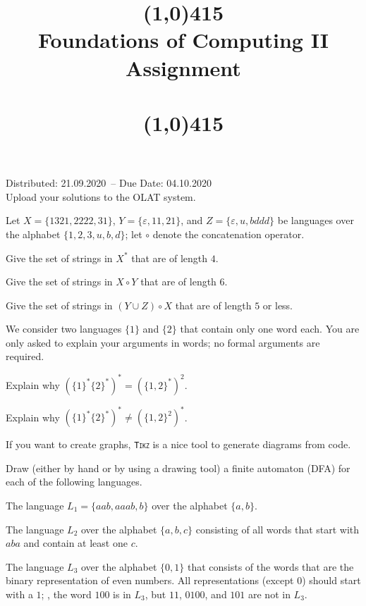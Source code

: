 \documentclass{exercise}
\title{\line(1,0){415}\\
  Foundations of Computing II\\
  \Large Assignment \theexercise\\[1em]
  \large{\topics}\\
  \line(1,0){415}}
\newcommand{\distdate}{21.09.2020}
\newcommand{\duedate}{04.10.2020}
\begin{document}
\maketitle

\begin{center}
  Distributed: \distdate\ -- Due Date: \duedate\\[1em]
  Upload your solutions to the OLAT system.\\[3em]
\end{center}


\subtask Let $X = \{1321,2222,31\}$, $Y =\{\varepsilon,11,21\}$, and
  $Z = \{\varepsilon,u,bddd\}$ be languages over the alphabet $\{1,2,3,u,b,d\}$;
  let $\circ$ denote the concatenation operator.
  \begin{taskitems}
    \item Give the set of strings in $X^*$ that are of length $4$.
    \item Give the set of strings in $X \circ Y$ that are of length $6$.
    \item Give the set of strings in $(Y \cup Z) \circ X$ that are of length $5$ or less.
  \end{taskitems}


\subtask We consider two languages $\{1\}$ and $\{2\}$ that contain only one word each.
  You are only asked to explain your arguments in words; no formal arguments are
  required. 
  \begin{taskitems}
    \item Explain why $(\{1\}^*\{2\}^*)^* =   (\{1,2\}^*)^2$.
    \item Explain why $(\{1\}^*\{2\}^*)^* \ne (\{1,2\}^2)^*$.
  \end{taskitems}



If you want to create graphs, \texttt{\textsc{Tikz}} is a nice tool to generate diagrams
from code.

\subtask Draw (either by hand or by using a drawing tool) a finite
  automaton (DFA) for each of the following languages.
  \begin{taskitems}
    \item The language $L_1=\{aab,aaab,b\}$ over the alphabet $\{a,b\}$.
    \item The language $L_2$ over the alphabet $\{a,b,c\}$ consisting of all words that start with
      $aba$ and contain at least one $c$.
    \item The language $L_3$ over the alphabet $\{0,1\}$ that consists of the words that are the binary
      representation of even numbers.  All representations (except $0$) should start with a $1$; \eg,
			the word $100$ is in $L_3$, but $11$, $0100$, and $101$ are not in $L_3$.
  \end{taskitems}
\end{document}

